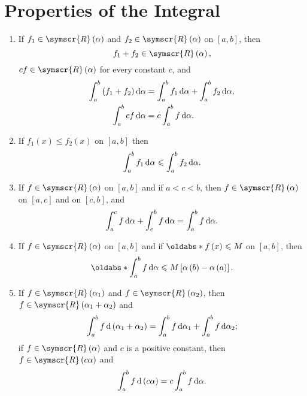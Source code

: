 \section{Properties of the Integral}

\begin{theorem}
    \leavevmode
    \begin{enumerate}
        \item If \(f_1\in\symscr{R}\left(\alpha\right)\) and \(f_2\in\symscr{R}\left(\alpha\right)\) on \(\left[a,b\right]\), then
        \begin{equation*}
            f_1+f_2\in\symscr{R}\left(\alpha\right),
        \end{equation*}
        \(cf\in\symscr{R}\left(\alpha\right)\) for every constant \(c\), and
        \begin{align*}
            \int_a^b\left(f_1+f_2\right)\odif{\alpha}&=\int_a^bf_1\odif{\alpha}+\int_a^bf_2\odif{\alpha},\\
            \int_a^bcf\odif{\alpha}&=c\int_a^bf\odif{\alpha}.
        \end{align*}
        \item If \(f_1\left(x\right)\leqslant f_2\left(x\right)\) on \(\left[a,b\right]\) then
        \begin{equation*}
            \int_a^bf_1\odif{\alpha}\leqslant\int_a^bf_2\odif{\alpha}.
        \end{equation*}
        \item If \(f\in\symscr{R}\left(\alpha\right)\) on \(\left[a,b\right]\) and if \(a<c<b\), then \(f\in\symscr{R}\left(\alpha\right)\) on \(\left[a,c\right]\) and on \(\left[c,b\right]\), and
        \begin{equation*}
            \int_a^cf\odif{\alpha}+\int_c^bf\odif{\alpha}=\int_a^bf\odif{\alpha}.
        \end{equation*}
        \item If \(f\in\symscr{R}\left(\alpha\right)\) on \(\left[a,b\right]\) and if \(\abs[f\left(x\right)]\leqslant M\) on \(\left[a,b\right]\), then
        \begin{equation*}
            \abs[\int_a^bf\odif{\alpha}]\leqslant M\left[\alpha\left(b\right)-\alpha\left(a\right)\right].
        \end{equation*}
        \item If \(f\in\symscr{R}\left(\alpha_1\right)\) and \(f\in\symscr{R}\left(\alpha_2\right)\), then \(f\in\symscr{R}\left(\alpha_1+\alpha_2\right)\) and
        \begin{equation*}
            \int_a^bf\odif{\left(\alpha_1+\alpha_2\right)}=\int_a^bf\odif{\alpha_1}+\int_a^bf\odif{\alpha_2};
        \end{equation*}
        if \(f\in\symscr{R}\left(\alpha\right)\) and \(c\) is a positive constant, then \(f\in\symscr{R}\left(c\alpha\right)\) and
        \begin{equation*}
            \int_a^bf\odif{\left(c\alpha\right)}=c\int_a^bf\odif{\alpha}.
        \end{equation*}
    \end{enumerate}
\end{theorem}

